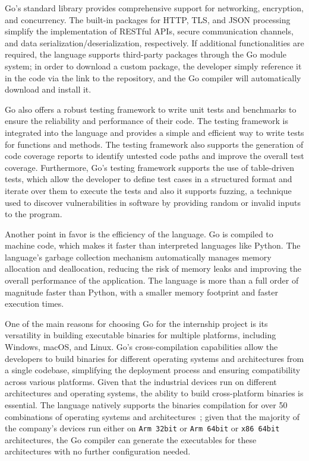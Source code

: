 Go's standard library provides comprehensive support for networking, encryption, and concurrency. The built-in packages for HTTP, TLS, and JSON processing simplify the implementation of RESTful APIs, secure communication channels, and data serialization/deserialization, respectively. If additional functionalities are required, the language supports third-party packages through the Go module system; in order to download a custom package, the developer simply reference it in the code via the link to the repository, and the Go compiler will automatically download and install it.

Go also offers a robust testing framework to write unit tests and benchmarks to ensure the reliability and performance of their code. The testing framework is integrated into the language and provides a simple and efficient way to write tests for functions and methods. The testing framework also supports the generation of code coverage reports to identify untested code paths and improve the overall test coverage. Furthermore, Go's testing framework supports the use of table-driven tests, which allow the developer to define test cases in a structured format and iterate over them to execute the tests and also it supports fuzzing, a technique used to discover vulnerabilities in software by providing random or invalid inputs to the program.

Another point in favor is the efficiency of the language. Go is compiled to machine code, which makes it faster than interpreted languages like Python. The language's garbage collection mechanism automatically manages memory allocation and deallocation, reducing the risk of memory leaks and improving the overall performance of the application. The language is more than a full order of magnitude faster than Python, with a smaller memory footprint and faster execution times.~\cite{go-lang-performance}

One of the main reasons for choosing Go for the internship project is its versatility in building executable binaries for multiple platforms, including Windows, macOS, and Linux. Go's cross-compilation capabilities allow the developers to build binaries for different operating systems and architectures from a single codebase, simplifying the deployment process and ensuring compatibility across various platforms. Given that the industrial devices run on different architectures and operating systems, the ability to build cross-platform binaries is essential. The language natively supports the binaries compilation for over 50 combinations of operating systems and architectures~\cite{go-lang-compilation-combo}; given that the majority of the company's devices run either on \texttt{Arm 32bit} or \texttt{Arm 64bit} or \texttt{x86 64bit} architectures, the Go compiler can generate the executables for these architectures with no further configuration needed.



